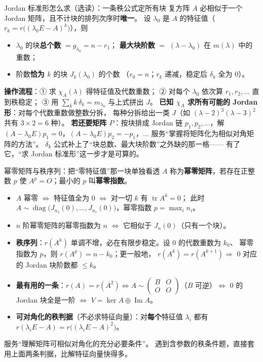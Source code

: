 \begin{fdeep}{Jordan 标准形怎么求（选读）：一条秩公式定所有块}
复方阵 $A$ 必相似于一个 Jordan 矩阵，且不计块的排列次序时\textbf{唯一}。
设 $\lambda_0$ 是 $A$ 的特征值（$r_k=r\bigl((\lambda_0E-A)^{k}\bigr)$），则
\begin{itemize}[leftmargin=1.8em,itemsep=0.15em]
\item $\lambda_0$ 的块\textbf{总个数} $=g_{\lambda_0}=n-r_1$；
      \textbf{最大块阶数} $=$ $(\lambda-\lambda_0)$ 在 $m(\lambda)$ 中的重数；
\item 阶数\textbf{恰为 $k$} 的块 $J_k(\lambda_0)$ 的个数
      （$r_0=n$；$r_k$ 递减，稳定后 $\delta_k$ 全为 $0$）。
\end{itemize}
\textbf{操作流程}：① 求 $\chi_A(\lambda)$ 得特征值及代数重数；
② 对每个 $\lambda_0$ 依次算 $r_1,r_2,\dots$ 直到秩稳定；
③ 用 $\sum_k k\,\delta_k=m_{\lambda_0}$ 与上式拼出 $J$。
\textbf{已知 $\chi_A$ 求所有可能的 Jordan 形}：对每个代数重数做整数分拆，
每种分拆给出一类 $J$（如 $(\lambda-2)^{3}(\lambda-3)^{2}$ 共有 $3\times2=6$ 种）。
\textbf{若还要矩阵 $P$}：按块排成 Jordan 链 $p_1,p_2,\dots$，解
$(A-\lambda_0E)p_1=0$，$(A-\lambda_0E)p_2=-p_1$，$\dots$
\fbref{}服务“掌握将矩阵化为相似对角矩阵的方法”。
$\delta_k$ 公式补上了“块总数、最大块阶数”之外缺的那一格——
有了它，“求 Jordan 标准形”这一步才是可算的。
\end{fdeep}

\begin{fdeep}{幂零矩阵与秩序列：把“零特征值”那一块单独看透}
$A$ 称为\textbf{幂零矩阵}，若存在正整数 $p$ 使 $A^{p}=O$；最小的 $p$ 叫\textbf{幂零指数}。
\begin{itemize}[leftmargin=1.8em,itemsep=0.15em]
\item $A$ 幂零 $\iff$ 特征值全为 $0$ $\iff$ 对一切 $k$ 有 $\operatorname{tr}A^{k}=0$；
      此时 $A\sim\operatorname{diag}\bigl(J_{n_1}(0),\dots,J_{n_s}(0)\bigr)$，幂零指数 $p=\max_i n_i$。
\item $n$ 阶幂零矩阵的幂零指数为 $n$ $\iff$ 它相似于 $J_n(0)$（只有一个块）。
\item \textbf{秩序列}：$r(A^{k})$ 单调不增，必在有限步稳定。设 $0$ 的代数重数为 $k_0$、
      幂零指数为 $p$，则 $r(A^{p})=n-k_0$；更一般地，
      $r(A^{k})=r(A^{k+1})\Longrightarrow$ $0$ 对应的 Jordan 块阶数都 $\le k$。
\item \textbf{最有用的一条}：$r(A)=r(A^{2})\iff A\sim
      \begin{pmatrix}B&O\\O&O\end{pmatrix}$（$B$ 可逆）$\iff$ $0$ 的 Jordan 块全是一阶
      $\iff$ $V=\ker A\oplus\operatorname{Im}A$。
\item \textbf{可对角化的秩判据}（不必求特征向量）：对\textbf{每个}特征值 $\lambda_i$ 都有
      $r(\lambda_iE-A)=r\bigl((\lambda_iE-A)^{2}\bigr)$。
\end{itemize}
\fbref{}服务“理解矩阵可相似对角化的充分必要条件”。
遇到含参数的秩条件题，直接套用上面两条判据，比解特征向量快得多。
\end{fdeep}

